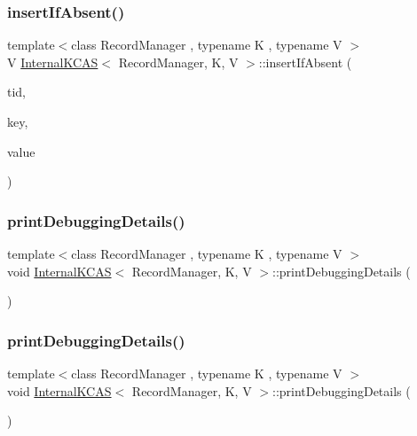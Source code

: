\subsubsection{\texorpdfstring{insert\+If\+Absent()}{insertIfAbsent()}\hspace{0.1cm}{\footnotesize\ttfamily [2/2]}}
{\footnotesize\ttfamily template$<$class Record\+Manager , typename K , typename V $>$ \\
V \hyperlink{classInternalKCAS}{Internal\+K\+C\+AS}$<$ Record\+Manager, K, V $>$\+::insert\+If\+Absent (\begin{DoxyParamCaption}\item[{const int}]{tid,  }\item[{const K \&}]{key,  }\item[{const V \&}]{value }\end{DoxyParamCaption})\hspace{0.3cm}{\ttfamily [inline]}}

\mbox{\label{classInternalKCAS_a03139bf48fad9708cf170f246696870a}} 
\subsubsection{\texorpdfstring{print\+Debugging\+Details()}{printDebuggingDetails()}\hspace{0.1cm}{\footnotesize\ttfamily [1/2]}}
{\footnotesize\ttfamily template$<$class Record\+Manager , typename K , typename V $>$ \\
void \hyperlink{classInternalKCAS}{Internal\+K\+C\+AS}$<$ Record\+Manager, K, V $>$\+::print\+Debugging\+Details (\begin{DoxyParamCaption}{ }\end{DoxyParamCaption})}

\mbox{\label{classInternalKCAS_a03139bf48fad9708cf170f246696870a}} 
\subsubsection{\texorpdfstring{print\+Debugging\+Details()}{printDebuggingDetails()}\hspace{0.1cm}{\footnotesize\ttfamily [2/2]}}
{\footnotesize\ttfamily template$<$class Record\+Manager , typename K , typename V $>$ \\
void \hyperlink{classInternalKCAS}{Internal\+K\+C\+AS}$<$ Record\+Manager, K, V $>$\+::print\+Debugging\+Details (\begin{DoxyParamCaption}{ }\end{DoxyParamCaption})}

